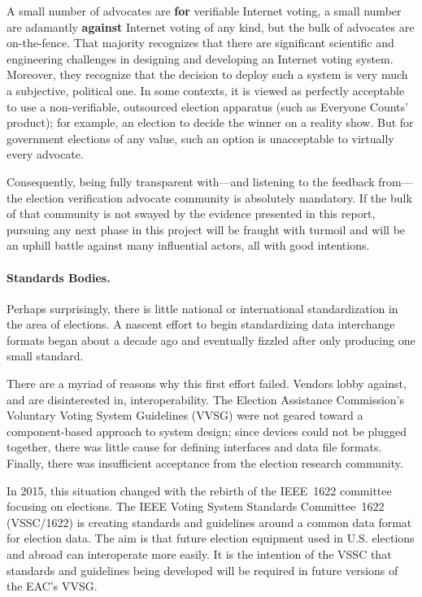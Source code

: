 A small number of advocates are \textbf{for} verifiable Internet
voting, a small number are adamantly \textbf{against} Internet voting
of any kind, but the bulk of advocates are on-the-fence. That majority
recognizes that there are significant scientific and engineering
challenges in designing and developing an Internet voting system.
Moreover, they recognize that the decision to deploy such a system is
very much a subjective, political one. In some contexts, it is viewed
as perfectly acceptable to use a non-verifiable, outsourced election
apparatus (such as Everyone Counts' product); for example, an election
to decide the winner on a reality show. But for government elections
of any value, such an option is unacceptable to virtually every
advocate.

Consequently, being fully transparent with---and listening to the
feedback from---the election verification advocate community is
absolutely mandatory. If the bulk of that community is not swayed by
the evidence presented in this report, pursuing any next phase in this
project will be fraught with turmoil and will be an uphill battle
against many influential actors, all with good intentions.

\paragraph{Standards Bodies.} Perhaps surprisingly, there is little
national or international standardization in the area of elections. A
nascent effort to begin standardizing data interchange formats began
about a decade ago and eventually fizzled after only producing one
small standard.

There are a myriad of reasons why this first effort failed. Vendors
lobby against, and are disinterested in, interoperability. The
Election Assistance Commission's Voluntary Voting System Guidelines
(VVSG) were not geared toward a component-based approach to system
design; since devices could not be plugged together, there was little 
cause for defining interfaces and data file formats. Finally, there
was insufficient acceptance from the election research community.

In 2015, this situation changed with the rebirth of the IEEE~1622
committee focusing on elections. The IEEE Voting System Standards
Committee~1622 (VSSC/1622) is creating standards and guidelines around
a common data format for election data. The aim is that future
election equipment used in U.S. elections and abroad can interoperate
more easily. It is the intention of the VSSC that standards and
guidelines being developed will be required in future versions of the
EAC's VVSG.

